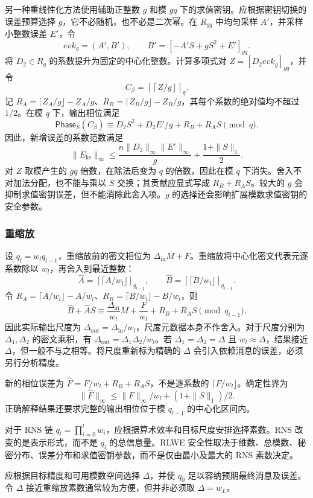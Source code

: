 另一种重线性化方法使用辅助正整数 $g$ 和模 $gq$ 下的求值密钥。应根据密钥切换的误差预算选择 $g$，它不必随机，也不必是二次幂。在 $R_{gq}$ 中均匀采样 $A'$，并采样小整数误差 $E'$，令
\[
\mathit{evk}_g=(A',B'),\qquad B'=[-A'S+gS^2+E']_{gq}.
\]
将 $D_2\in R_q$ 的系数提升为固定的中心化整数。计算多项式对 $Z=[D_2\mathit{evk}_g]_{gq}$，并令
\[
C_\beta=\left[\left\lceil Z/g\right\rfloor\right]_q.
\]
记 $R_A=\lceil Z_A/g\rfloor-Z_A/g$、$R_B=\lceil Z_B/g\rfloor-Z_B/g$，其每个系数的绝对值均不超过 $1/2$。在模 $q$ 下，输出相位满足
\[
\mathsf{Phase}_S(C_\beta)\equiv D_2S^2+D_2E'/g+R_B+R_AS\pmod q.
\]
因此，新增误差的系数范数满足
\[
\|E_{\mathrm{ks}}\|_\infty\leq
\frac{n\|D_2\|_\infty\|E'\|_\infty}{g}
+\frac{1+\|S\|_1}{2}.
\]
对 $Z$ 取模产生的 $gq$ 倍数，在除法后变为 $q$ 的倍数，因此在模 $q$ 下消失。舍入不对加法分配，也不能与乘以 $S$ 交换；其贡献应显式写成 $R_B+R_AS$。较大的 $g$ 会抑制求值密钥误差，但不能消除此舍入项。$g$ 的选择还会影响扩展模数求值密钥的安全参数。


\subsubsection{重缩放}
\label{subsubsec:ckks-mult-cipher-rescale}

设 $q_l=w_lq_{l-1}$，重缩放前的密文相位为 $\Delta_{\mathrm{in}}M+F$。重缩放将中心化密文代表元逐系数除以 $w_l$，再舍入到最近整数：
\[
\widehat A=[\lceil A/w_l\rfloor]_{q_{l-1}},\qquad
\widehat B=[\lceil B/w_l\rfloor]_{q_{l-1}}.
\]
令 $R_A=\lceil A/w_l\rfloor-A/w_l$、$R_B=\lceil B/w_l\rfloor-B/w_l$，则
\[
\widehat B+\widehat AS\equiv
\frac{\Delta_{\mathrm{in}}}{w_l}M+
\frac{F}{w_l}+R_B+R_AS\pmod {q_{l-1}}.
\]
因此实际输出尺度为 $\Delta_{\mathrm{out}}=\Delta_{\mathrm{in}}/w_l$，尺度元数据本身不作舍入。对于尺度分别为 $\Delta_1,\Delta_2$ 的密文乘积，有 $\Delta_{\mathrm{out}}=\Delta_1\Delta_2/w_l$。若 $\Delta_1=\Delta_2=\Delta$ 且 $w_l\approx\Delta$，结果接近 $\Delta$，但一般不与之相等。将尺度重新标为精确的 $\Delta$ 会引入依赖消息的误差，必须另行分析精度。

新的相位误差为 $\widehat F=F/w_l+R_B+R_AS$，不是逐系数的 $\lceil F/w_l\rfloor$。确定性界为
\[
\|\widehat F\|_\infty\leq\|F\|_\infty/w_l+(1+\|S\|_1)/2.
\]
正确解释结果还要求完整的输出相位位于模 $q_{l-1}$ 的中心化区间内。

对于 RNS 链 $q_l=\prod_{i=0}^l w_i$，应根据算术效率和目标尺度安排选择素数。RNS 改变的是表示形式，而不是 $q_l$ 的总信息量。RLWE 安全性取决于维数、总模数、秘密分布、误差分布和求值密钥参数，而不是仅由最小及最大的 RNS 素数决定。

 应根据目标精度和可用模数空间选择 $\Delta$，并使 $q_0$ 足以容纳预期最终消息及误差。令 $\Delta$ 接近重缩放素数通常较为方便，但并非必须取 $\Delta=w_L$。

